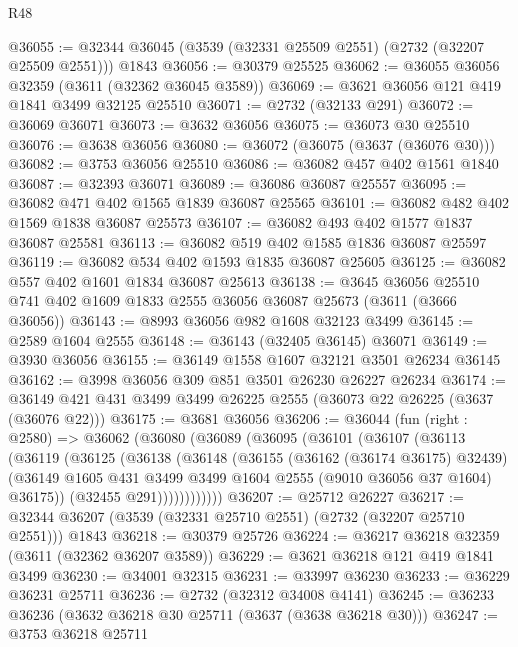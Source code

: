 \begin{lexlean}{R48}
\begin{coremodule}
@36055 := @32344 @36045 (@3539 (@32331 @25509 @2551) (@2732 (@32207 @25509 @2551))) @1843
@36056 := @30379 @25525
@36062 := @36055 @36056 @32359 (@3611 (@32362 @36045 @3589))
@36069 := @3621 @36056 @121 @419 @1841 @3499 @32125 @25510
@36071 := @2732 (@32133 @291)
@36072 := @36069 @36071
@36073 := @3632 @36056
@36075 := @36073 @30 @25510
@36076 := @3638 @36056
@36080 := @36072 (@36075 (@3637 (@36076 @30)))
@36082 := @3753 @36056 @25510
@36086 := @36082 @457 @402 @1561 @1840
@36087 := @32393 @36071
@36089 := @36086 @36087 @25557
@36095 := @36082 @471 @402 @1565 @1839 @36087 @25565
@36101 := @36082 @482 @402 @1569 @1838 @36087 @25573
@36107 := @36082 @493 @402 @1577 @1837 @36087 @25581
@36113 := @36082 @519 @402 @1585 @1836 @36087 @25597
@36119 := @36082 @534 @402 @1593 @1835 @36087 @25605
@36125 := @36082 @557 @402 @1601 @1834 @36087 @25613
@36138 := @3645
    @36056
    @25510
    @741
    @402
    @1609
    @1833
    @2555
    @36056
    @36087
    @25673
    (@3611 (@3666 @36056))
@36143 := @8993 @36056 @982 @1608 @32123 @3499
@36145 := @2589 @1604 @2555
@36148 := @36143 (@32405 @36145) @36071
@36149 := @3930 @36056
@36155 := @36149 @1558 @1607 @32121 @3501 @26234 @36145
@36162 := @3998 @36056 @309 @851 @3501 @26230 @26227 @26234
@36174 := @36149 @421 @431 @3499 @3499 @26225 @2555 (@36073 @22 @26225 (@3637 (@36076 @22)))
@36175 := @3681 @36056
@36206 := @36044
    (fun (right : @2580) =>
    @36062
      (@36080
        (@36089
          (@36095
            (@36101
              (@36107
                (@36113
                  (@36119
                    (@36125
                      (@36138
                        (@36148
                          (@36155
                            (@36162 (@36174 @36175) @32439)
                            (@36149
                              @1605
                              @431
                              @3499
                              @3499
                              @1604
                              @2555
                              (@9010 @36056 @37 @1604)
                              @36175))
                          (@32455 @291))))))))))))
@36207 := @25712 @26227
@36217 := @32344 @36207 (@3539 (@32331 @25710 @2551) (@2732 (@32207 @25710 @2551))) @1843
@36218 := @30379 @25726
@36224 := @36217 @36218 @32359 (@3611 (@32362 @36207 @3589))
@36229 := @3621 @36218 @121 @419 @1841 @3499
@36230 := @34001 @32315
@36231 := @33997 @36230
@36233 := @36229 @36231 @25711
@36236 := @2732 (@32312 @34008 @4141)
@36245 := @36233 @36236 (@3632 @36218 @30 @25711 (@3637 (@3638 @36218 @30)))
@36247 := @3753 @36218 @25711

\end{coremodule}
\end{lexlean}

